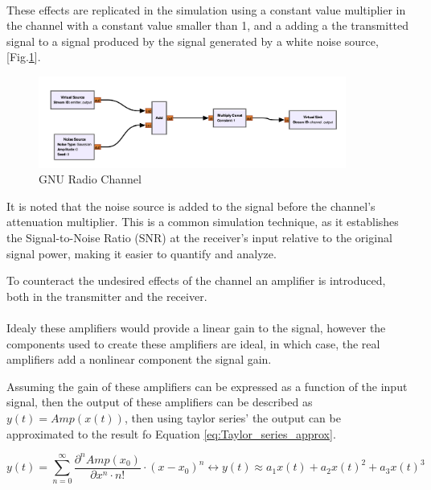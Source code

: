 \paragraph{}
These effects are replicated in the simulation using a constant value multiplier in 
the channel with a constant value smaller than 1, and a adding a the transmitted signal to 
a signal produced by the signal generated by a white noise source, [Fig.\ref{fig:Gnu_Channel}].

\begin{figure}[H]
    \centering
    \includegraphics*[width=0.9\textwidth]{Images/GNU_Channel.png}
    \caption{GNU Radio Channel}
    \label{fig:Gnu_Channel}
\end{figure}

It is noted that the noise source is added to the signal before the channel's attenuation multiplier. This is a common simulation technique, as it establishes the Signal-to-Noise Ratio (SNR) at the receiver's input relative to the original signal power, making it easier to quantify and analyze.

To counteract the undesired effects of the channel an amplifier is introduced, both 
in the transmitter and the receiver.

\paragraph{}
Idealy these amplifiers would provide a linear gain to the signal, however the components 
used to create these amplifiers are ideal, in which case, the real amplifiers add a nonlinear 
component the signal gain.

Assuming the gain of these amplifiers can be expressed as a function of the input signal, 
then the output of these amplifiers can be described as \(y(t) = Amp(x(t))\), then using 
taylor series' the output can be approximated to the result fo Equation \ref{eq:Taylor_series_approx}.

\begin{equation}
    y(t) = \sum_{n=0}^{\infty} \frac{\partial^n Amp(x_0)}{\partial x^n \cdot n!} \cdot (x - x_0)^n \leftrightarrow y(t) \approx a_1x(t) + a_2{x(t)}^2 + a_3{x(t)}^3
    \label{eq:Taylor_series_approx}
\end{equation}

